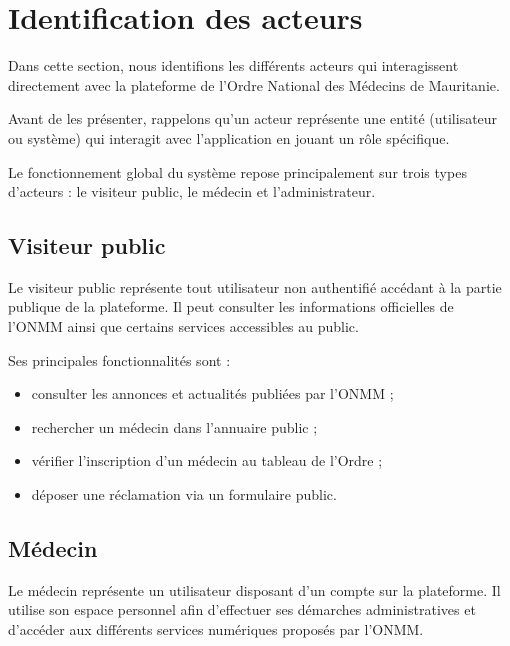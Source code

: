 ﻿\documentclass[12pt,a4paper]{report}
\begin{document}
\section{Identification des acteurs}

Dans cette section, nous identifions les différents acteurs qui
interagissent directement avec la plateforme de l’Ordre National des
Médecins de Mauritanie.

Avant de les présenter, rappelons qu’un acteur représente une entité
(utilisateur ou système) qui interagit avec l’application en jouant
un rôle spécifique.

Le fonctionnement global du système repose principalement sur trois
types d’acteurs : le visiteur public, le médecin et l’administrateur.

\subsection{Visiteur public}

Le visiteur public représente tout utilisateur non authentifié
accédant à la partie publique de la plateforme. Il peut consulter
les informations officielles de l’ONMM ainsi que certains services
accessibles au public.

Ses principales fonctionnalités sont :

\begin{itemize}

\item consulter les annonces et actualités publiées par l’ONMM ;


\item rechercher un médecin dans l’annuaire public ;

\item vérifier l’inscription d’un médecin au tableau de l’Ordre ;

\item déposer une réclamation via un formulaire public.

\end{itemize}

\subsection{Médecin}

Le médecin représente un utilisateur disposant d’un compte sur la
plateforme. Il utilise son espace personnel afin d’effectuer ses
démarches administratives et d’accéder aux différents services
numériques proposés par l’ONMM.
\end{document}

